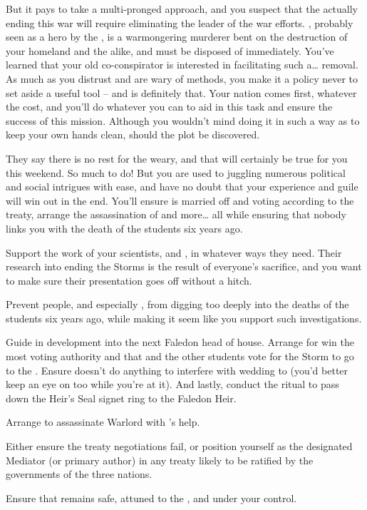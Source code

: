 \documentclass[char]{GL2020}
\begin{document}
But it pays to take a multi-pronged approach, and you suspect that the actually ending this war will require eliminating the leader of the \pShip{} war efforts. \cLoud{\full}, probably seen as a hero by the \pShippies{}, is a warmongering murderer bent on the destruction of your homeland and the \pFarm{} alike, and must be disposed of immediately. You've learned that your old co-conspirator \cEvil{} is interested in facilitating such a\ldots{} removal. As much as you distrust \cEvil{} and are wary of \cEvil{\their} methods, you make it a policy never to set aside a useful tool -- and \cEvil{} is definitely that. Your nation comes first, whatever the cost, and you'll do whatever you can to aid \cEvil{} in this task and ensure the success of this mission. Although you wouldn't mind doing it in such a way as to keep your own hands clean, should the plot be discovered.

They say there is no rest for the weary, and that will certainly be true for you this weekend. So much to do! But you are used to juggling numerous political and social intrigues with ease, and have no doubt that your experience and guile will win out in the end.  You'll ensure \cHeir{} is married off and voting according to the treaty, arrange the assassination of \cLoud{} and more\ldots{} all while ensuring that nobody links you with the death of the students six years ago.

\begin{itemz}
	\item Support the work of your scientists, \cHeadScientist{} and \cAssistantScientist{}, in whatever ways they need. Their research into ending the Storms is the result of everyone's sacrifice, and you want to make sure their presentation goes off without a hitch. 
	\item Prevent people, and especially \cHeir{}, from digging too deeply into the deaths of the students six years ago, while making it seem like you support such investigations.
	\item Guide \cHeir{} in \cHeir{\their} development into the next Faledon head of house. Arrange for \cHeir{\them} win the most voting authority and that \cHeir{\they} and the other students vote for the Storm to go to the \pShip{}. Ensure \cHeir{} doesn't do anything to interfere with \cHeir{\their} wedding to \cChupStudent{} (you'd better keep an eye on \cChupStudent{} too while you're at it). And lastly, conduct the ritual to pass down the Heir's Seal signet ring to the Faledon Heir.
	\item Arrange to assassinate Warlord \cLoud{} with \cEvil{}'s help.
	\item Either ensure the treaty negotiations fail, or position yourself as the designated Mediator (or primary author) in any treaty likely to be ratified by the governments of the three nations.
	\item Ensure that \iMirror{} remains safe, attuned to the \pTech{}, and under your control.
\end{itemz}
\end{document}
